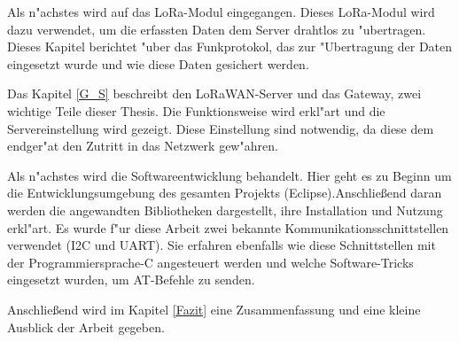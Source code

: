 Als n"achstes wird auf das LoRa-Modul eingegangen. 
Dieses LoRa-Modul 
wird dazu verwendet, um die erfassten Daten dem 
Server drahtlos zu "ubertragen. Dieses Kapitel 
berichtet "uber das Funkprotokol, das zur "Ubertragung 
der Daten eingesetzt wurde und wie diese Daten 
gesichert werden.
 
Das Kapitel \ref{G_S} beschreibt den LoRaWAN-Server und 
das Gateway, zwei wichtige Teile dieser Thesis. Die 
Funktionsweise wird erkl"art und die Servereinstellung 
wird gezeigt. Diese Einstellung sind notwendig, da
diese dem endger"at den Zutritt in das Netzwerk gew"ahren.

Als n"achstes wird die Softwareentwicklung behandelt. 
Hier geht es zu Beginn um die Entwicklungsumgebung des 
gesamten Projekts (Eclipse).Anschlie\ss{}end daran 
werden die angewandten Bibliotheken dargestellt, 
ihre Installation und Nutzung erkl"art. Es wurde f"ur 
diese Arbeit zwei bekannte Kommunikationsschnittstellen 
verwendet (\ac{I2C} und \ac{UART}). Sie erfahren ebenfalls wie diese 
Schnittstellen mit der Programmiersprache-C angesteuert 
werden und welche Software-Tricks eingesetzt wurden, 
um AT-Befehle zu senden.

Anschlie\ss{}end  wird im Kapitel \ref{Fazit} eine 
Zusammenfassung und eine kleine Ausblick der Arbeit 
gegeben.
   